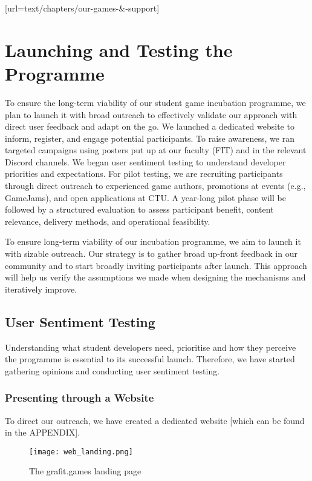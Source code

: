 [url=text/chapters/our-games-&-support]
\chapter{Launching and Testing the Programme}\label{chap:launch-testing}

\begin{chapterabstract}
	To ensure the long-term viability of our student game incubation programme, we plan to launch it with broad outreach to effectively validate our approach with direct user feedback and adapt on the go. We launched a dedicated website to inform, register, and engage potential participants. To raise awareness, we ran targeted campaigns using posters put up at our faculty (FIT) and in the relevant Discord channels. We began user sentiment testing to understand developer priorities and expectations. For pilot testing, we are recruiting participants through direct outreach to experienced game authors, promotions at events (e.g., GameJams), and open applications at CTU. A year-long pilot phase will be followed by a structured evaluation to assess participant benefit, content relevance, delivery methods, and operational feasibility.
\end{chapterabstract}

To ensure long-term viability of our incubation programme, we aim to launch it with sizable outreach. Our strategy is to gather broad up-front feedback in our community and to start broadly inviting participants after launch. This approach will help us verify the assumptions we made when designing the mechanisms and iteratively improve.

\section{User Sentiment Testing}
Understanding what student developers need, prioritise and how they perceive the programme is essential to its successful launch. Therefore, we have started gathering opinions and conducting user sentiment testing.

\subsection{Presenting through a Website}
To direct our outreach, we have created a dedicated website [which can be found in the APPENDIX].
\begin{figure}[H]
    \texttt{[image: web\_landing.png]}
    \caption{The grafit.games landing page}
    \label{fig:web_landing}
\end{figure}

